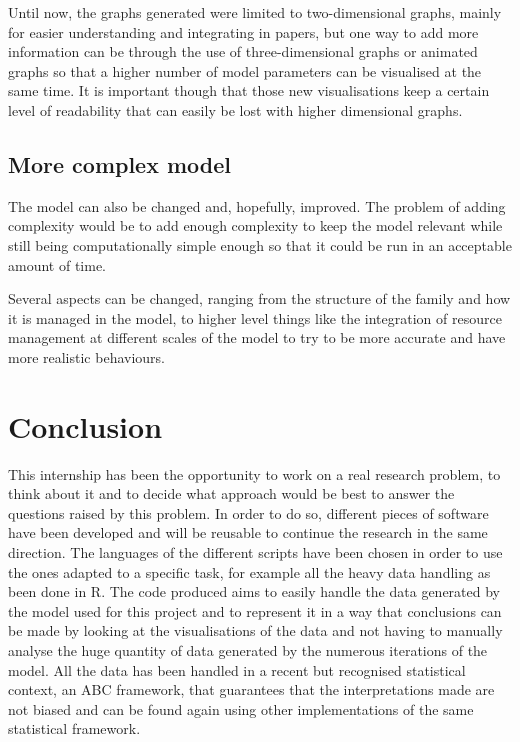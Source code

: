 \documentclass[a4paper,12pt]{report}
\begin{document}
Until now, the graphs generated were limited to two-dimensional graphs, mainly for easier understanding and integrating in papers, but one way to add more information can be through the use of three-dimensional graphs or animated graphs so that a higher number of model parameters can be visualised at the same time. It is important though that those new visualisations keep a certain level of readability that can easily be lost with higher dimensional graphs.

\section{More complex model}
The model can also be changed and, hopefully, improved. The problem of adding complexity would be to add enough complexity to keep the model relevant while still being computationally simple enough so that it could be run in an acceptable amount of time.

Several aspects can be changed, ranging from the structure of the family and how it is managed in the model, to higher level things like the integration of resource management at different scales of the model to try to be more accurate and have more realistic behaviours.


\chapter*{Conclusion}

This internship has been the opportunity to work on a real research problem, to think about it and to decide what approach would be best to answer the questions raised by this problem. In order to do so, different pieces of software have been developed and will be reusable to continue the research in the same direction. The languages of the different scripts have been chosen in order to use the ones adapted to a specific task, for example all the heavy data handling as been done in R. The code produced aims to easily handle the data generated by the model used for this project and to represent it in a way that conclusions can be made by looking at the visualisations of the data and not having to manually analyse the huge quantity of data generated by the numerous iterations of the model. All the data has been handled in a recent but recognised statistical context, an ABC framework, that guarantees that the interpretations made are not biased and can be found again using other implementations of the same statistical framework.
\end{document}
